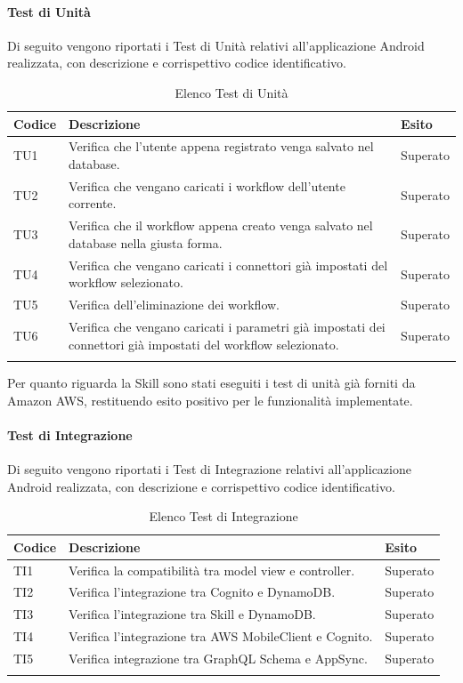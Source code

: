 \paragraph{Test di Unità}
\label{sec:tuRQ}
Di seguito vengono riportati i Test di Unità relativi all'applicazione Android realizzata, con descrizione e corrispettivo codice identificativo.
\begin{center}
	\centering
	\renewcommand{\arraystretch}{1.5}
	\begin{longtable}{  p{1.5cm}  p{10.5cm} p{2cm}  }
		\rowcolor{tableHeadYellow}
		\textbf{Codice}   & \textbf{Descrizione} & \textbf{Esito} \\ 
		\endhead
		TU1 & Verifica che l’utente appena registrato venga salvato nel database.  & Superato \\
		TU2 & Verifica che vengano caricati i workflow dell’utente corrente. & Superato \\
		TU3 & Verifica che il workflow appena creato venga salvato nel database nella giusta forma. & Superato \\
		TU4 & Verifica che vengano caricati i connettori già impostati del workflow selezionato. & Superato \\
		TU5 & Verifica dell’eliminazione dei workflow. & Superato \\
		TU6 & Verifica che vengano caricati i parametri già impostati dei connettori già impostati del workflow selezionato. & Superato \\
		\rowcolor{white}
		\caption{Elenco Test di Unità}
	\end{longtable}
\end{center}
Per quanto riguarda la Skill sono stati eseguiti i test di unità già forniti da Amazon AWS, restituendo esito positivo per le funzionalità implementate.
\paragraph{Test di Integrazione}
\label{sec:tiRQ}
Di seguito vengono riportati i Test di Integrazione relativi all'applicazione Android realizzata, con descrizione e corrispettivo codice identificativo.
\begin{center}
	\centering
	\renewcommand{\arraystretch}{1.5}
	\begin{longtable}{  p{1.5cm}  p{10.5cm} p{2cm}  }
		\rowcolor{tableHeadYellow}
		\textbf{Codice}   & \textbf{Descrizione} & \textbf{Esito} \\ 
		\endhead
		TI1 & Verifica la compatibilità tra model view e controller.  & Superato \\
		TI2 & Verifica l’integrazione tra Cognito e DynamoDB. & Superato \\
		TI3 & Verifica l’integrazione tra Skill e DynamoDB. & Superato \\
		TI4 & Verifica l’integrazione tra AWS MobileClient e Cognito. & Superato \\
		TI5 & Verifica integrazione tra GraphQL Schema e AppSync. & Superato \\
		\rowcolor{white}
		\caption{Elenco Test di Integrazione}
	\end{longtable}
\end{center}
